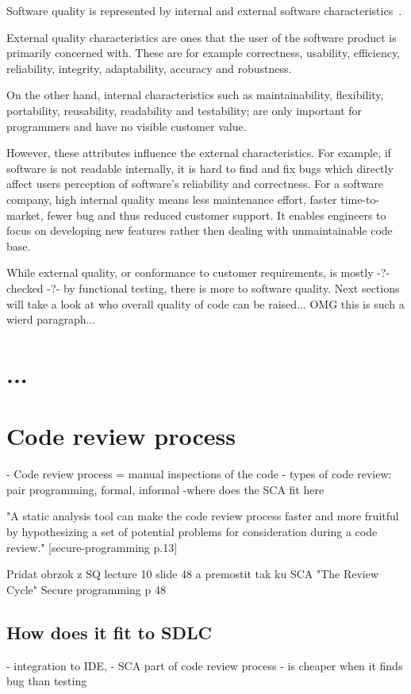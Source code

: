 \documentclass[
  digital, %
  table,   %
  lof,     %
  lot,     %
  oneside,
]{fithesis3}
\begin{document}
Software quality is represented by internal and external software characteristics~\cite{code-complete}.

External quality characteristics are ones that the user of the software product is primarily concerned with. These are for example correctness, usability, efficiency, reliability, integrity, adaptability, accuracy and robustness. 

On the other hand, internal characteristics such as maintainability, flexibility, portability, reusability, readability and testability; are only important for programmers and have no visible customer value. 

However, these attributes influence the external characteristics. For example, if software is not readable internally, it is hard to find and fix bugs which directly affect users perception of software's reliability and correctness. For a software company, high internal quality means less maintenance effort, faster time-to-market, fewer bug and thus reduced customer support. It enables engineers to focus on developing new features rather then dealing with unmaintainable code base. 
  
While external quality, or conformance to customer requirements, is mostly -?- checked -?- by functional testing, there is more to software quality. Next sections will take a look at who overall quality of code can be raised... OMG this is such a wierd paragraph... 

\section{...}
  
\section{Code review process}
- Code review process = manual inspections of the code
- types of code review: pair programming, formal, informal
-where does the SCA fit here

"A static analysis
tool can make the code review process faster and more fruitful by hypothesizing
a set of potential problems for consideration during a code review." [secure-programming p.13]

Pridat obrzok z SQ lecture 10 slide 48 a premostit tak ku SCA "The Review Cycle" Secure programming p 48

\subsection{How does it fit to SDLC}
- integration to IDE, 
- SCA part of code review process
- is cheaper when it finds bug than testing
  
\end{document}
